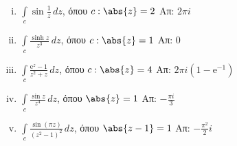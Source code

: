 \documentclass[a4paper,table]{report}
\begin{document}
\begin{enumerate}
    \begin{enumerate}[i)]
      \item $\int\limits_c\sin \frac{1}{z}\,dz$, \quad όπου $c:\abs{z}=2$ 
        \hfill Απ: $2\pi i$
      \item $\int\limits_c\frac{\sinh z}{z^3}\,dz$, \quad όπου $c:\abs{z}=1$ 
        \hfill Απ: $0$
      \item $\int\limits_c\frac{\mathrm{e}^{z}-1}{z^2+z}\,dz$, \quad όπου $c:\abs{z}=4$ 
        \hfill Απ: $2\pi i(1- \mathrm{e}^{-1})$
      \item $ \int \limits_{c} \frac{\sin{z}}{z^{4}} \,{dz} $, \quad όπου $ \abs{z}
        =1 $ \hfill Απ: $ - \frac{\pi i}{3} $ 
      \item $ \int \limits_{c} \frac{\sin{(\pi z)}}{(z^{2}-1)^{2}} \,{dz} $, \quad 
        όπου $ \abs{z-1} = 1 $
        \hfill Απ: $ - \frac{\pi ^{2}}{2} i $  
    \end{enumerate}

\end{enumerate}
\end{document}
